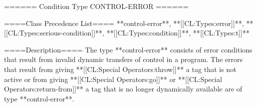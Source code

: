 ====== Condition Type CONTROL-ERROR ======

====Class Precedence List====
**control-error**, **[[CL:Types:error]]**, **[[CL:Types:serious-condition]]**, **[[CL:Types:condition]]**, **[[CL:Types:t]]**

====Description====
The type **control-error** consists of error conditions that result from invalid dynamic transfers of control in a program. The errors that result from giving **[[CL:Special Operators:throw]]** a tag that is not active or from giving **[[CL:Special Operators:go]]** or **[[CL:Special Operators:return-from]]** a tag that is no longer dynamically available are of type **control-error**.

